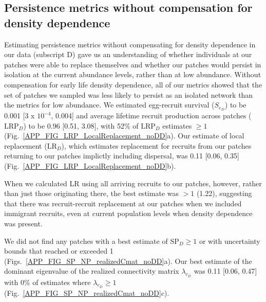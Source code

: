 \documentclass[12pt, oneside]{article}   	%
\begin{document}

\subsection{Persistence metrics without compensation for density dependence} \label{APP_SEC_RESULTS_noDD} %
Estimating persistence metrics without compensating for density dependence in our data (subscript D) gave us an understanding of whether individuals at our patches were able to replace themselves and whether our patches would persist in isolation at the current abundance levels, rather than at low abundance. Without compensation for early life density dependence, all of our metrics showed that the set of patches we sampled was less likely to persist as an isolated network than the metrics for low abundance. We estimated egg-recruit survival ($S_{e_{D}}$) to be 0.001 [3 x $10^{-4}$, 0.004] and average lifetime recruit production across patches ($\text{LRP}_{D}$) to be 0.96 [0.51, 3.08], with 52\% of $\text{LRP}_{D}$ estimates $\geq 1$ (Fig.\ \ref{APP_FIG_LRP_LocalReplacement_noDD}a). Our estimate of local replacement ($\text{LR}_{D}$), which estimates replacement for recruits from our patches returning to our patches implictly including dispersal, was 0.11 [0.06, 0.35] (Fig.\ \ref{APP_FIG_LRP_LocalReplacement_noDD}b). 

When we calculated LR using all arriving recruits to our patches, however, rather than just those originating there, the best estimate was $> 1$ (1.22), suggesting that there was recruit-recruit replacement at our patches when we included immigrant recruits, even at current population levels when density dependence was present.

We did not find any patches with a best estimate of $\text{SP}_{D} \geq 1$ or with uncertainty bounds that reached or exceeded 1 (Figs.\ \ref{APP_FIG_SP_NP_realizedCmat_noDD}a). Our best estimate of the dominant eigenvalue of the realized connectivity matrix $\lambda_{c_{D}}$ was 0.11 [0.06, 0.47] with 0\% of estimates where $\lambda_{c_{D}} \geq 1$ (Fig.\ \ref{APP_FIG_SP_NP_realizedCmat_noDD}c). 
\end{document}
